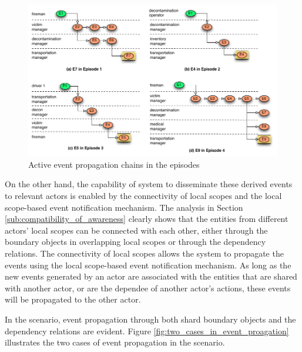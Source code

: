 \begin{figure}[htbp] %
	\centering
	\includegraphics[width=5.8in]{event_chains_in_eps.pdf} 
	\caption{Active event propagation chains in the episodes}
	\label{fig:event_chains_in_eps}
\end{figure}

On the other hand, the capability of system to disseminate these derived events to relevant actors is enabled by the connectivity of local scopes and the local scope-based event notification mechanism. The analysis in Section \ref{sub:compatibility_of_awareness} clearly shows that the entities from different actors' local scopes can be connected with each other, either through the boundary objects in overlapping local scopes or through the dependency relations. The connectivity of local scopes allows the system to propagate the events using the local scope-based event notification mechanism. As long as the new events generated by an actor are associated with the entities that are shared with another actor, or are the dependee of another actor's actions, these events will be propagated to the other actor. 

In the scenario, event propagation through both shard boundary objects and the dependency relations are evident. Figure \ref{fig:two_cases_in_event_proagation} illustrates the two cases of event propagation in the scenario.

